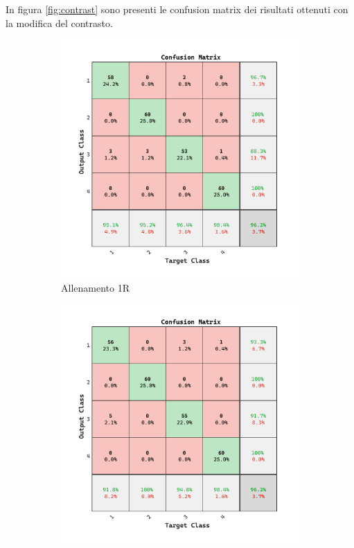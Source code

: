 In figura \cref{fig:contrast} sono presenti le confusion matrix dei risultati ottenuti con la modifica del contrasto.

\begin{figure}[ht]
    \centering
    \begin{subfigure}{0.45\textwidth}
        \includegraphics[width=\textwidth]{addestramento-rete-neurale/one-contrast.pdf}
        \caption{Allenamento 1R} 
    \end{subfigure}
    \begin{subfigure}{0.45\textwidth}
        \includegraphics[width=\textwidth]{addestramento-rete-neurale/two-contrast.pdf}

\end{subfigure}
\end{figure}
